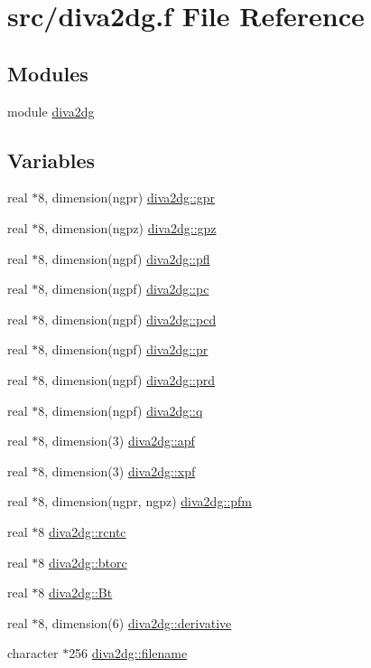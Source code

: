 \hypertarget{diva2dg_8f}{
\section{src/diva2dg.f File Reference}
\label{diva2dg_8f}
}
\subsection*{Modules}
\begin{CompactItemize}
\item 
module \hyperlink{namespacediva2dg}{diva2dg}
\end{CompactItemize}
\subsection*{Variables}
\begin{CompactItemize}
\item 
real $\ast$8, dimension(ngpr) \hyperlink{namespacediva2dg_35a63eee0b80c66baac30a3de0be0be9}{diva2dg::gpr}
\item 
real $\ast$8, dimension(ngpz) \hyperlink{namespacediva2dg_b3cfb25ed528c0d24d80d968099c69ea}{diva2dg::gpz}
\item 
real $\ast$8, dimension(ngpf) \hyperlink{namespacediva2dg_321f730bc6ba784a50be03bfc676e6b8}{diva2dg::pfl}
\item 
real $\ast$8, dimension(ngpf) \hyperlink{namespacediva2dg_cdb5a604b2a0c574c93685c0135a1cb1}{diva2dg::pc}
\item 
real $\ast$8, dimension(ngpf) \hyperlink{namespacediva2dg_002854ccd8f06e9862a53c8e55667130}{diva2dg::pcd}
\item 
real $\ast$8, dimension(ngpf) \hyperlink{namespacediva2dg_0fddfb0fc5baf44d76608830e93f933c}{diva2dg::pr}
\item 
real $\ast$8, dimension(ngpf) \hyperlink{namespacediva2dg_28afc7cdeb0d17dfc2f755ee01aa119f}{diva2dg::prd}
\item 
real $\ast$8, dimension(ngpf) \hyperlink{namespacediva2dg_c30c06cc584a484217b2e77ea4afefb0}{diva2dg::q}
\item 
real $\ast$8, dimension(3) \hyperlink{namespacediva2dg_4af07d7599c2950bdf3884c213a9dc0e}{diva2dg::apf}
\item 
real $\ast$8, dimension(3) \hyperlink{namespacediva2dg_7c5baa5f6aeaf641f17822bf2c727e65}{diva2dg::xpf}
\item 
real $\ast$8, dimension(ngpr, ngpz) \hyperlink{namespacediva2dg_ac412e391d7bc3f388a20118b792a62d}{diva2dg::pfm}
\item 
real $\ast$8 \hyperlink{namespacediva2dg_8de740eca25720b2d20619260c87f18a}{diva2dg::rcntc}
\item 
real $\ast$8 \hyperlink{namespacediva2dg_9de71c8856c2b2d0a48aff84e01eb7cf}{diva2dg::btorc}
\item 
real $\ast$8 \hyperlink{namespacediva2dg_d338316587924c2d6f35996f556aad88}{diva2dg::Bt}
\item 
real $\ast$8, dimension(6) \hyperlink{namespacediva2dg_f75800039ab67d18c3a79738e48309d0}{diva2dg::derivative}
\item 
character $\ast$256 \hyperlink{namespacediva2dg_698afd231129418ec2b8c08ee235931d}{diva2dg::filename}
\end{CompactItemize}
